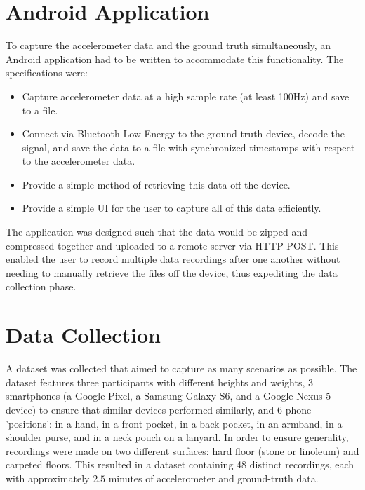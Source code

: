         \section{Android Application}

            To capture the accelerometer data and the ground truth simultaneously, an Android application had to be written to accommodate this functionality. The specifications were:

            \begin{itemize}
                \item Capture accelerometer data at a high sample rate (at least 100Hz) and save to a file.
                \item Connect via Bluetooth Low Energy to the ground-truth device, decode the signal, and save the data to a file with synchronized timestamps with respect to the accelerometer data.
                \item Provide a simple method of retrieving this data off the device.
                \item Provide a simple UI for the user to capture all of this data efficiently.
            \end{itemize}

            The application was designed such that the data would be zipped and compressed together and uploaded to a remote server via HTTP POST. This enabled the user to record multiple data recordings after one another without needing to manually retrieve the files off the device, thus expediting the data collection phase.


        \section{Data Collection}

            A dataset was collected that aimed to capture as many scenarios as possible. The dataset features three participants with different heights and weights, 3 smartphones (a Google Pixel, a Samsung Galaxy S6, and a Google Nexus 5 device) to ensure that similar devices performed similarly, and 6 phone 'positions': in a hand, in a front pocket, in a back pocket, in an armband, in a shoulder purse, and in a neck pouch on a lanyard. In order to ensure generality, recordings were made on two different surfaces: hard floor (stone or linoleum) and carpeted floors. This resulted in a dataset containing 48 distinct recordings, each with approximately $2.5$ minutes of accelerometer and ground-truth data. 

